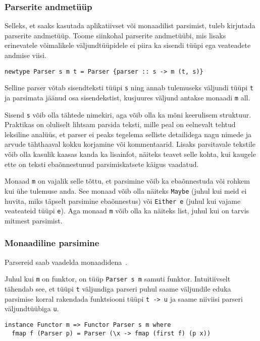 \documentclass[12pt]{article}
\begin{document}
      \subsubsection{Parserite andmetüüp}\label{parserityyp}
        Selleks, et saaks kasutada aplikatiivset või monaadilist parsimist, tuleb kirjutada parserite andmetüüp. Toome siinkohal parserite andmetüübi, mis lisaks erinevatele võimalikele väljundtüüpidele ei piira ka sisendi tüüpi ega veateadete andmise viisi.

        \begin{verbatim}newtype Parser s m t = Parser {parser :: s -> m (t, s)}\end{verbatim}

        Selline parser võtab sisendteksti tüüpi \verb!s! ning annab tulemuseks väljundi tüüpi \verb!t! ja parsimata jäänud osa sisendekstist, kusjuures väljund antakse monaadi \verb!m! all.

        Sisend \verb!s! võib olla tähtede nimekiri, aga võib olla ka mõni keerulisem struktuur. Praktikas on oluliselt lihtsam parsida teksti, mille peal on eelnevalt tehtud leksiline analüüs, et parser ei peaks tegelema selliste detailidega nagu nimede ja arvude tähthaaval kokku korjamine või kommentaarid. Lisaks parsitavale tekstile võib olla kasulik kaasas kanda ka lisainfot, näiteks teavet selle kohta, kui kaugele ette on teksti ebaõnnestunud parsimiskatsete käigus vaadatud.

        Monaad \verb!m! on vajalik selle tõttu, et parsimine võib ka ebaõnnestuda või rohkem kui ühe tulemuse anda. See monaad võib olla näiteks \verb!Maybe! (juhul kui meid ei huvita, miks täpselt parsimine ebaõnnestus) või \verb!Either e! (juhul kui vajame veateateid tüüpi \verb!e!). Aga monaad \verb!m! võib olla ka näiteks list, juhul kui on tarvis mitmest parsimist.
      \subsubsection{Monaadiline parsimine}
        Parsereid saab vaadelda monaadidena~\cite{Mon}.

        Juhul kui \verb!m! on funktor, on tüüp \verb!Parser s m! samuti funktor. Intuitiivselt tähendab see, et tüüpi \verb!t! väljundiga parseri puhul saame väljundile eduka parsimise korral rakendada funktsiooni tüüpi \verb!t -> u! ja saame niiviisi parseri väljundtüübiga \verb!u!.

        \begin{verbatim}instance Functor m => Functor Parser s m where
  fmap f (Parser p) = Parser (\x -> fmap (first f) (p x))\end{verbatim}
\end{document}
